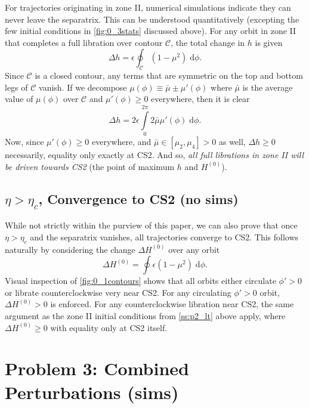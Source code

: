 \documentclass[
        fleqn,
        usenatbib,
    ]{mnras}
\newcommand*{\p}[1]{\left(#1\right)}
\begin{document}
For trajectories originating in zone II, numerical simulations indicate they can
never leave the separatrix. This can be understood quantitatively (excepting the
few initial conditions in \autoref{fig:0_3stats} discussed above). For any orbit
in zone II that completes a full libration over contour $\mathcal{C}$, the total
change in $h$ is given
\begin{equation}
    \Delta h = \epsilon \oint_{\mathcal{C}} (1 - \mu^2)\;\mathrm{d}\phi.
\end{equation}
Since $\mathcal{C}$ is a closed contour, any terms that are symmetric on the top
and bottom legs of $\mathcal{C}$ vanish. If we decompose $\mu(\phi) \equiv
\bar{\mu} \pm \mu'(\phi)$ where $\bar{\mu}$ is the average value of $\mu(\phi)$
over $\mathcal{C}$ and $\mu'(\phi) \geq 0$ everywhere, then it is clear
\begin{equation}
    \Delta h = 2\epsilon \int\limits_0^{2\pi} 2\bar{\mu}\mu'(\phi)
            \;\mathrm{d}\phi.
\end{equation}
Now, since $\mu'(\phi) \geq 0$ everywhere, and $\bar{\mu} \in [\mu_2, \mu_4] >
0$ as well, $\Delta h \geq  0$ necessarily, equality only exactly at CS2. And
so, \emph{all full librations in zone II will be driven towards CS2} (the point
of maximum $h$ and $H^{(0)}$).

\subsection{$\eta > \eta_c$, Convergence to CS2 (no sims)}

While not strictly within the purview of this paper, we can also prove that once
$\eta > \eta_c$ and the separatrix vanishes, all trajectories converge to CS2.
This follows naturally by considering the change $\Delta H^{(0)}$ over any orbit
\begin{equation}
    \Delta H^{(0)} = \oint \epsilon\p{1 - \mu^2}\;\mathrm{d}\phi.
\end{equation}
Visual inspection of \autoref{fig:0_1contours} shows that all orbits either
circulate $\phi' > 0$ or librate counterclockwise very near CS2. For any
circulating $\phi' > 0$ orbit, $\Delta H^{(0)} > 0$ is enforced. For any
counterclockwise libration near CS2, the same argument as the zone II initial
conditions from \autoref{ss:p2_lt} above apply, where $\Delta H^{(0)} \geq 0$
with equality only at CS2 itself.

\section{Problem 3: Combined Perturbations (sims)}\label{s:p3}
\end{document}

